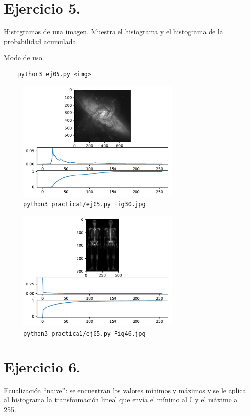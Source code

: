 \documentclass[11pt, spanish]{article}
\begin{document}
\section{Ejercicio 5.}
Histogramas de una imagen. Muestra el histograma y el histograma de la probabilidad acumulada.

Modo de uso
\begin{verbatim}
    python3 ej05.py <img>
\end{verbatim}

\begin{figure}[H]
\centering
  \includegraphics[height=6cm]{informe-imgs/ej05-1.pdf}
  \caption{\texttt{python3 practica1/ej05.py Fig30.jpg}}
\end{figure}

\begin{figure}[H]
\centering
  \includegraphics[height=6cm]{informe-imgs/ej05-2.pdf}
  \caption{\texttt{python3 practica1/ej05.py Fig46.jpg}}
\end{figure}


\section{Ejercicio 6.}
Ecualización ``naive'': se encuentran los valores mínimos y máximos y se le aplica al histograma la transformación
lineal que envía el mínimo al 0 y el máximo a 255.
\end{document}
